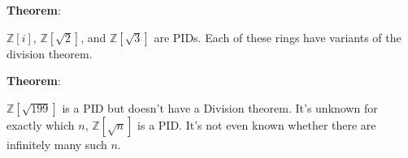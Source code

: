 \documentclass{article}
\begin{document}
\begin{multicols*}{2}
\textbf{Theorem}:

$\mathbb{Z}[i]$, $\mathbb{Z}[\sqrt{2}]$, and $\mathbb{Z}[\sqrt{3}]$ are PIDs. Each of these rings have variants of the division theorem.

\textbf{Theorem}:

$\mathbb{Z}[\sqrt{199}]$ is a PID but doesn't have a Division theorem. It's unknown for exactly which $n$, $\mathbb{Z}[\sqrt{n}]$ is a PID. It's not even known whether there are infinitely many such $n$.


\end{multicols*}
\end{document}
